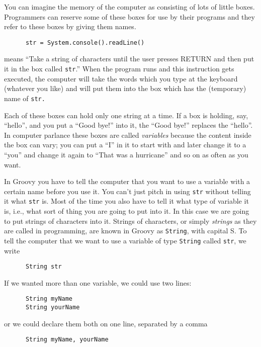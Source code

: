 You can imagine the memory of the computer as consisting of lots of
little boxes.  Programmers can reserve some of these boxes for
use by their programs and they refer to these boxes by giving
them names.  

\begin{Verbatim}
      str = System.console().readLine()
\end{Verbatim}

means ``Take a string of characters until the user presses RETURN and
then put it in the box called \verb!str!.''  When the program runs and
this instruction gets executed, the computer will take the words which
you type at the keyboard (whatever you like) and will put them into
the box which has the (temporary) name of \verb!str.!

Each of these boxes can hold only one string at a time.  If a box is
holding, say, ``hello'', and you put a ``Good bye!'' into it, the
``Good bye!'' replaces the ``hello''.  In computer parlance these
boxes are called \emph{variables} because the content inside the box
can vary; you can put a ``I'' in it to start with and later change it
to a ``you'' and change it again to ``That was a hurricane'' and so on
as often as you want.

In Groovy you have to tell the computer that you want to use a variable
with a certain name before you use it.  You can't just pitch in using \verb!str!
without telling it what \verb!str! is.  Most of the time you also have to
tell it what type of variable it is, i.e., what sort of thing you are going
to put into it.  In this case we are going to put strings of characters into it.
Strings of characters, or simply \emph{strings} as they are called in programming, are
known in Groovy as \verb!String!, with capital S.  To tell the computer that we want to use a
variable of type \verb!String! called \verb!str!, we write

\begin{Verbatim}
      String str
\end{Verbatim}

If we wanted more than one variable, we could use two lines:

\begin{Verbatim}
      String myName
      String yourName
\end{Verbatim}

or we could declare them both on one line, separated by a comma
\begin{Verbatim}
      String myName, yourName
\end{Verbatim}

